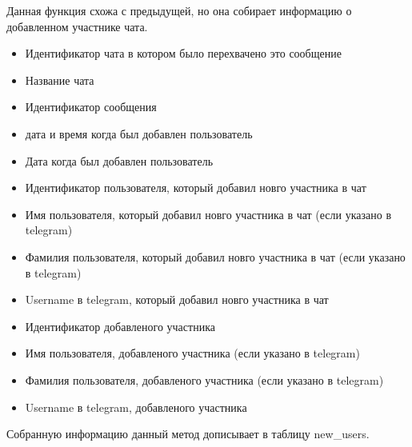 \documentclass[
]{book}
\providecommand{\tightlist}{%
  \setlength{\itemsep}{0pt}\setlength{\parskip}{0pt}}
\begin{document}
Данная функция схожа с предыдущей, но она собирает информацию о добавленном участнике чата.

\begin{itemize}
\tightlist
\item
  Идентификатор чата в котором было перехвачено это сообщение
\item
  Название чата
\item
  Идентификатор сообщения
\item
  дата и время когда был добавлен пользователь
\item
  Дата когда был добавлен пользователь
\item
  Идентификатор пользователя, который добавил новго участника в чат
\item
  Имя пользователя, который добавил новго участника в чат (если указано в telegram)
\item
  Фамилия пользователя, который добавил новго участника в чат (если указано в telegram)
\item
  Username в telegram, который добавил новго участника в чат
\item
  Идентификатор добавленого участника
\item
  Имя пользователя, добавленого участника (если указано в telegram)
\item
  Фамилия пользователя, добавленого участника (если указано в telegram)
\item
  Username в telegram, добавленого участника
\end{itemize}

Собранную информацию данный метод дописывает в таблицу new\_users.
\end{document}
